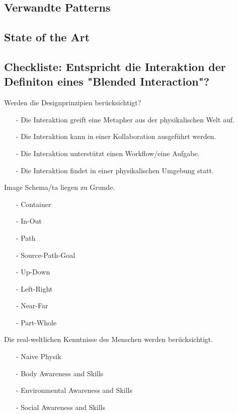 \subsection*{Verwandte Patterns}
\otherpatterns

\subsection*{State of the Art}
\stateoftheart

\subsection*{Checkliste: Entspricht die Interaktion der Definiton eines "Blended Interaction"?}
\checkbox{\designprinciples} Werden die Designprinzipien berücksichtigt?
\begin{itemize}
\item[-] Die Interaktion greift eine Metapher aus der physikalischen Welt auf.
\item[-] Die Interaktion kann in einer Kollaboration ausgeführt werden.
\item[-] Die Interaktion unterstützt einen Workflow/eine Aufgabe.
\item[-] Die Interaktion findet in einer physikalischen Umgebung statt.
\end{itemize} 

\checkbox{\imageschemata} Image Schema/ta liegen zu Grunde.
\begin{itemize}
\item[-] \checkbox{\imageSchemaContainer} Container
\item[-] \checkbox{\imageSchemaInOut} In-Out
\item[-] \checkbox{\imageSchemaPath} Path
\item[-] \checkbox{\imageSchemaSourcePathGoal} Source-Path-Goal
\item[-] \checkbox{\imageSchemaUpDown} Up-Down
\item[-] \checkbox{\imageSchemaLeftRight} Left-Right
\item[-] \checkbox{\imageSchemaNearFar} Near-Far
\item[-] \checkbox{\imageSchemaPartWhole} Part-Whole
\end{itemize}

\checkbox{\realworld} Die real-weltlichen Kenntnisse des Menschen werden berücksichtigt.
\begin{itemize}
\item[-] \checkbox{\realworldNaivePhysic} Naive Physik
\item[-] \checkbox{\realworldBodyAwareness} Body Awareness and Skills
\item[-] \checkbox{\realworldEnvironmentAwareness} Environmental Awareness and Skills
\item[-] \checkbox{\realworldSocialAwareness} Social Awareness and Skills
\end{itemize}

